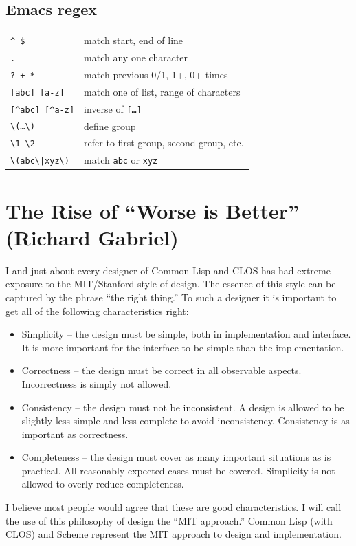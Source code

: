 \documentclass[10pt,twoside,openright]{memoir}
\begin{document}
\section{Emacs regex}

{\footnotesize
\begin{tabular}{ll}
\texttt{\^{} \$} & match start, end of line \\
\texttt{.} & match any one character \\
\texttt{?~+ *} & match previous 0/1, 1+, 0+ times \\
\texttt{[abc] [a-z]} & match one of list, range of characters \\
\texttt{[\^{}abc] [\^{}a-z]} & inverse of \texttt{[\dots]} \\
\texttt{\textbackslash{}(\dots\textbackslash{})} & define group \\
\texttt{\textbackslash{}1 \textbackslash{}2} & refer to first group, second group, etc. \\
\texttt{\textbackslash{}(abc\textbackslash{}|xyz\textbackslash{})} & match \texttt{abc} or \texttt{xyz} \\
\end{tabular}
}



\chapter{The Rise of ``Worse is Better'' (Richard Gabriel)}

I and just about every designer of Common Lisp and CLOS has had extreme exposure to the MIT/Stanford style of design. The essence of this style can be captured by the phrase ``the right thing.'' To such a designer it is important to get all of the following characteristics right:

\begin{itemize}  
\item Simplicity -- the design must be simple, both in implementation and interface. It is more important for the interface to be simple than the implementation.
\item Correctness -- the design must be correct in all observable aspects. Incorrectness is simply not allowed.
\item Consistency -- the design must not be inconsistent. A design is allowed to be slightly less simple and less complete to avoid inconsistency. Consistency is as important as correctness.
\item Completeness -- the design must cover as many important situations as is practical. All reasonably expected cases must be covered. Simplicity is not allowed to overly reduce completeness.
\end{itemize}
I believe most people would agree that these are good characteristics. I will call the use of this philosophy of design the ``MIT approach.'' Common Lisp (with CLOS) and Scheme represent the MIT approach to design and implementation.
\end{document}
